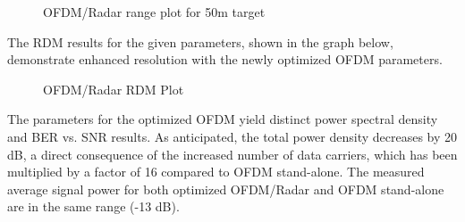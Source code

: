 \documentclass[conference]{IEEEtran}
\begin{document}
\begin{figure}[H]
\centering
{}
\caption{OFDM/Radar range plot for 50m target}
\end{figure} 
The RDM results for the given parameters, shown in the graph below, demonstrate enhanced resolution with the newly optimized OFDM parameters.
\begin{figure}[H]
\centering
{}
\caption{OFDM/Radar RDM Plot}
\end{figure} 

The parameters for the optimized OFDM yield distinct power spectral density and BER vs. SNR results. As anticipated, the total power density decreases by 20 dB, a direct consequence of the increased number of data carriers, which has been multiplied by a factor of 16 compared to OFDM stand-alone. The measured average signal power for both optimized OFDM/Radar and OFDM stand-alone are in the same range (-13 dB).
\end{document}
